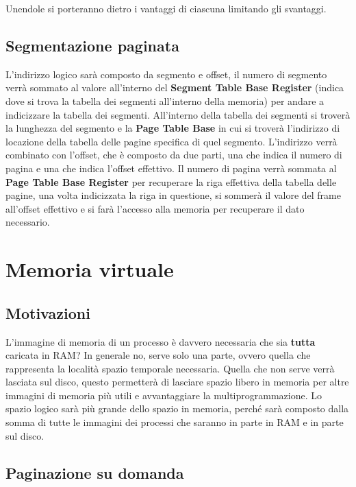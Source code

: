 \documentclass[a4paper, 12pt]{book}
\begin{document}
Unendole si porteranno dietro i vantaggi di ciascuna limitando gli svantaggi.

\section{Segmentazione paginata}

L'indirizzo logico sarà composto da segmento e offset, il numero di segmento verrà sommato al valore all'interno del \textbf{Segment Table Base Register} (indica dove si trova la tabella dei segmenti all'interno della memoria) 
per andare a indicizzare la tabella dei segmenti. All'interno della tabella dei segmenti si troverà la lunghezza del segmento e 
la \textbf{Page Table Base} in cui si troverà l'indirizzo di locazione della tabella delle pagine specifica di quel segmento. 
L'indirizzo verrà combinato con l'offset, che è composto da due parti, una che indica il numero di pagina e una che indica 
l'offset effettivo. Il numero di pagina verrà sommata al \textbf{Page Table Base Register} per recuperare la riga effettiva della 
tabella delle pagine, una volta indicizzata la riga in questione, si sommerà il valore del frame all'offset effettivo e si farà 
l'accesso alla memoria per recuperare il dato necessario. 

\chapter{Memoria virtuale}

\section{Motivazioni}

L'immagine di memoria di un processo è davvero necessaria che sia \textbf{tutta} caricata in RAM? In generale no, serve solo una parte,
ovvero quella che rappresenta la località spazio temporale necessaria. Quella che non serve verrà lasciata sul disco, 
questo permetterà di lasciare spazio libero in memoria per altre immagini di memoria più utili e avvantaggiare la multiprogrammazione.
Lo spazio logico sarà più grande dello spazio in memoria, perché sarà composto dalla somma di tutte le immagini dei processi che 
saranno in parte in RAM e in parte sul disco. 

\section{Paginazione su domanda}
\end{document}
